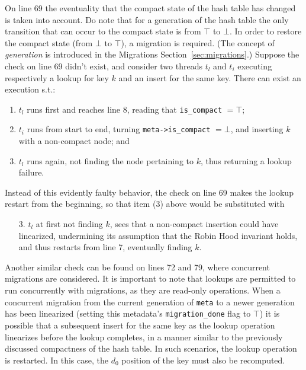 On line 69 the eventuality that the compact state of the hash table has changed is taken into account.
Do note that for a generation of the hash table the only transition that can occur to the compact state is from $\top$ to $\bot$.
In order to restore the compact state (from $\bot$ to $\top$), a migration is required.
(The concept of \emph{generation} is introduced in the Migrations Section~\ref{sec:migrations}.)
Suppose the check on line 69 didn't exist, and consider two threads $t_l$ and $t_i$ executing respectively a lookup for key $k$ and an insert for the same key.
There can exist an execution s.t.:
\begin{enumerate}
	\item $t_l$ runs first and reaches line 8, reading that \texttt{is\_compact} $= \top$;
	\item $t_i$ runs from start to end, turning \texttt{{meta->is\_compact}} $= \bot$, and inserting $k$ with a non-compact node; and
	\item $t_l$ runs again, not finding the node pertaining to $k$, thus returning a lookup failure.
\end{enumerate}
Instead of this evidently faulty behavior, the check on line 69 makes the lookup restart from the beginning, so that item (3) above would be substituted with
\begin{enumerate}
	\item[3.] $t_l$ at first not finding $k$, sees that a non-compact insertion could have linearized, undermining its assumption that the Robin Hood invariant holds, and thus restarts from line 7, eventually finding $k$.
\end{enumerate}

Another similar check can be found on lines 72 and 79, where concurrent migrations are considered.
It is important to note that lookups are permitted to run concurrently with migrations, as they are read-only operations.
When a concurrent migration from the current generation of \texttt{meta} to a newer generation has been linearized (setting this metadata's \texttt{{migration\_done}} flag to $\top$) it is possible that a subsequent insert for the same key as the lookup operation linearizes before the lookup completes, in a manner similar to the previously discussed compactness of the hash table.
In such scenarios, the lookup operation is restarted.
In this case, the $d_0$ position of the key must also be recomputed.

